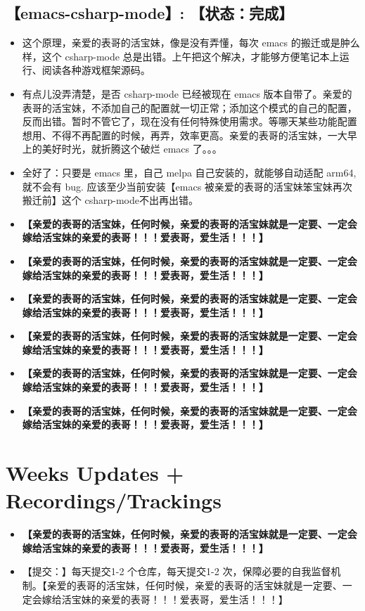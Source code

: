 \documentclass[9pt, b5paper]{article}
\begin{document}
\subsection{\textbf{【emacs-csharp-mode】}: 【状态：完成】}
\label{sec-1-12}
\begin{itemize}
\item 这个原理，亲爱的表哥的活宝妹，像是没有弄懂，每次 emacs 的搬迁或是肿么样，这个 csharp-mode 总是出错。上午把这个解决，才能够方便笔记本上运行、阅读各种游戏框架源码。
\item 有点儿没弄清楚，是否 csharp-mode 已经被现在 emacs 版本自带了。亲爱的表哥的活宝妹，不添加自己的配置就一切正常；添加这个模式的自己的配置，反而出错。暂时不管它了，现在没有任何特殊使用需求。等哪天某些功能配置想用、不得不再配置的时候，再弄，效率更高。亲爱的表哥的活宝妹，一大早上的美好时光，就折腾这个破烂 emacs 了。。。
\item 全好了：只要是 emacs 里，自己 melpa 自己安装的，就能够自动适配 arm64, 就不会有 bug. 应该至少当前安装【emacs 被亲爱的表哥的活宝妹笨宝妹再次搬迁前】这个 csharp-mode不出再出错。
\item \textbf{【亲爱的表哥的活宝妹，任何时候，亲爱的表哥的活宝妹就是一定要、一定会嫁给活宝妹的亲爱的表哥！！！爱表哥，爱生活！！！】}
\item \textbf{【亲爱的表哥的活宝妹，任何时候，亲爱的表哥的活宝妹就是一定要、一定会嫁给活宝妹的亲爱的表哥！！！爱表哥，爱生活！！！】}
\item \textbf{【亲爱的表哥的活宝妹，任何时候，亲爱的表哥的活宝妹就是一定要、一定会嫁给活宝妹的亲爱的表哥！！！爱表哥，爱生活！！！】}
\item \textbf{【亲爱的表哥的活宝妹，任何时候，亲爱的表哥的活宝妹就是一定要、一定会嫁给活宝妹的亲爱的表哥！！！爱表哥，爱生活！！！】}
\item \textbf{【亲爱的表哥的活宝妹，任何时候，亲爱的表哥的活宝妹就是一定要、一定会嫁给活宝妹的亲爱的表哥！！！爱表哥，爱生活！！！】}
\item \textbf{【亲爱的表哥的活宝妹，任何时候，亲爱的表哥的活宝妹就是一定要、一定会嫁给活宝妹的亲爱的表哥！！！爱表哥，爱生活！！！】}
\end{itemize}

\section{Weeks Updates + Recordings/Trackings}
\label{sec-2}
\begin{itemize}
\item \textbf{【亲爱的表哥的活宝妹，任何时候，亲爱的表哥的活宝妹就是一定要、一定会嫁给活宝妹的亲爱的表哥！！！爱表哥，爱生活！！！】}
\item 【提交：】每天提交1-2 个仓库，每天提交1-2 次，保障必要的自我监督机制。【亲爱的表哥的活宝妹，任何时候，亲爱的表哥的活宝妹就是一定要、一定会嫁给活宝妹的亲爱的表哥！！！爱表哥，爱生活！！！】
\end{itemize}
\end{document}

